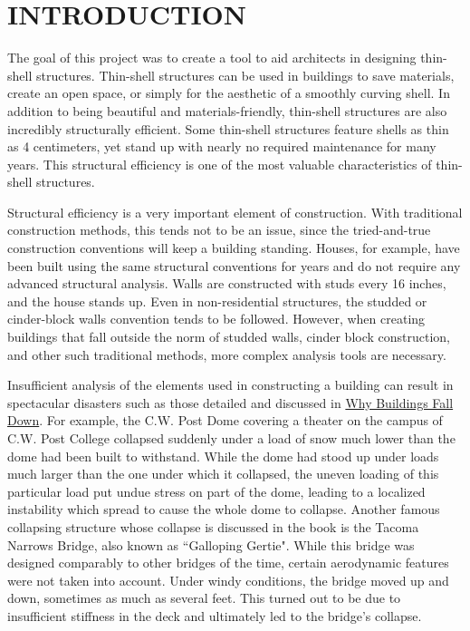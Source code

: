 \documentclass{thesis}
\begin{document}
\chapter{INTRODUCTION} \label{chp:introduction}

The goal of this project was to create a tool to aid architects in designing thin-shell structures.  Thin-shell structures can be used in
buildings to save materials, create an open space, or simply for the aesthetic of a smoothly curving shell.  In addition to being beautiful
and materials-friendly, thin-shell structures are also incredibly structurally efficient.  Some thin-shell structures feature shells as thin
as 4 centimeters, yet stand up with nearly no required maintenance for many years.  This structural efficiency is one of the most valuable
characteristics of thin-shell structures.

Structural efficiency is a very important element of construction.  With traditional construction methods, this tends not to be an issue, since
the tried-and-true construction conventions will keep a building standing.  Houses, for example, have been built using the same structural
conventions for years and do not require any advanced structural analysis.  Walls are constructed with studs every 16 inches, and the house
stands up.  Even in non-residential structures, the studded or cinder-block walls convention tends to be followed.  However, when creating
buildings that fall outside the norm of studded walls, cinder block construction, and other such traditional methods, more complex analysis
tools are necessary.

Insufficient analysis of the elements used in constructing a building can result in spectacular disasters such as those
detailed and discussed in \underline{Why Buildings Fall Down}\cite{levy92falldown}.  For example, the C.W. Post Dome covering a theater on the
campus of C.W. Post College collapsed suddenly under a load of snow much lower than the dome had been built to withstand.  While the dome had
stood up under loads much larger than the one under which it collapsed, the uneven loading of this particular load put undue stress on part
of the dome, leading to a localized instability which spread to cause the whole dome to collapse.  Another famous collapsing structure whose
collapse is discussed in the book is the Tacoma Narrows Bridge, also known as ``Galloping Gertie".  While this bridge was designed comparably
to other bridges of the time, certain aerodynamic features were not taken into account.  Under windy conditions, the bridge moved up and down,
sometimes as much as several feet.  This turned out to be due to insufficient stiffness in the deck and ultimately led to the bridge's
collapse.
\end{document}

